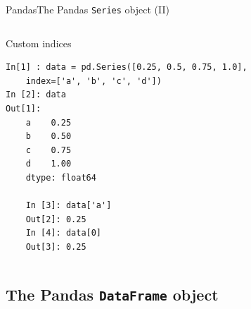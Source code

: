 \documentclass[10pt,compress]{beamer} %
\begin{document}
\begin{frame}[fragile]{Pandas}{The Pandas \texttt{Series} object (II)}
	\begin{columns}
		\begin{exampleblock}{\footnotesize{Custom indices}}
		\vspace{-0.2cm} 
			\begin{lstlisting}
In[1] : data = pd.Series([0.25, 0.5, 0.75, 1.0],
    index=['a', 'b', 'c', 'd'])
In [2]: data
Out[1]: 
    a    0.25
    b    0.50
    c    0.75
    d    1.00
    dtype: float64

    In [3]: data['a']
    Out[2]: 0.25
    In [4]: data[0]
    Out[3]: 0.25
\end{lstlisting}
\vspace{-0.2cm} 
\end{exampleblock}
	\end{columns}
\end{frame}

\subsection{The Pandas \texttt{DataFrame} object}
\end{document}
